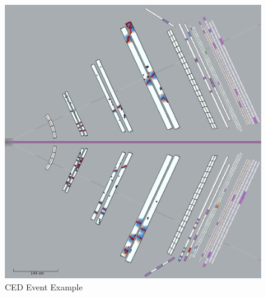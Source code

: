 \begin{figure}[hbt]
	\centering
	\includegraphics[width=1.0\columnwidth,keepaspectratio]{img/ced.png}
	\caption{CED Event Example}
	\label{fig:ced}
\end{figure}
